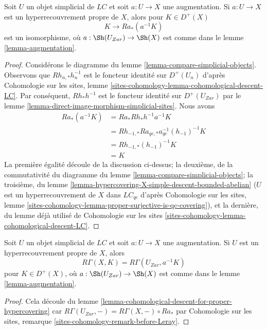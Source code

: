 \begin{lemma}
\label{lemma-cohomological-descent-for-proper-hypercovering}
Soit $U$ un objet simplicial de $\textit{LC}$ et soit $a : U \to X$
une augmentation. Si $a : U \to X$ est un hyperrecouvrement propre de $X$,
alors pour $K \in D^+(X)$
$$
K \to Ra_*(a^{-1}K)
$$
est un isomorphisme, où $a : \Sh(U_{Zar}) \to \Sh(X)$ est comme dans le lemme
\ref{lemma-augmentation}.
\end{lemma}

\begin{proof}
Considérons le diagramme du lemme \ref{lemma-compare-simplicial-objects}.
Observons que $Rh_{n, *}h_n^{-1}$ est le foncteur identité
sur $D^+(U_n)$ d'après Cohomologie sur les sites, lemme
\ref{sites-cohomology-lemma-cohomological-descent-LC}.
Par conséquent, $Rh_*h^{-1}$ est le foncteur identité sur
$D^+(U_{Zar})$ par
le lemme \ref{lemma-direct-image-morphism-simplicial-sites}.
Nous avons
\begin{align*}
Ra_*(a^{-1}K)
& =
Ra_*Rh_*h^{-1}a^{-1}K \\
& =
Rh_{-1, *}Ra_{qc, *}a_{qc}^{-1}(h_{-1})^{-1}K \\
& =
Rh_{-1, *}(h_{-1})^{-1}K \\
& =
K
\end{align*}
La première égalité découle de la discussion ci-dessus; la deuxième,
de la commutativité du diagramme du lemme
\ref{lemma-compare-simplicial-objects}; la troisième, du lemme
\ref{lemma-hypercovering-X-simple-descent-bounded-abelian}
($U$ est un hyperrecouvrement de $X$ dans $\textit{LC}_{qc}$ d'après Cohomologie
sur les sites, lemme
\ref{sites-cohomology-lemma-proper-surjective-is-qc-covering}),
et la dernière, du lemme déjà utilisé de Cohomologie sur les sites
\ref{sites-cohomology-lemma-cohomological-descent-LC}.
\end{proof}

\begin{lemma}
\label{lemma-compute-via-proper-hypercovering}
Soit $U$ un objet simplicial de $\textit{LC}$ et soit $a : U \to X$
une augmentation. Si $U$ est un hyperrecouvrement propre de $X$, alors
$$
R\Gamma(X, K) = R\Gamma(U_{Zar}, a^{-1}K)
$$
pour $K \in D^+(X)$, où $a : \Sh(U_{Zar}) \to \Sh(X)$
est comme dans le lemme \ref{lemma-augmentation}.
\end{lemma}

\begin{proof}
Cela découle du lemme
\ref{lemma-cohomological-descent-for-proper-hypercovering}
car $R\Gamma(U_{Zar}, -) = R\Gamma(X, -) \circ Ra_*$ par
Cohomologie sur les sites, remarque \ref{sites-cohomology-remark-before-Leray}.
\end{proof}


